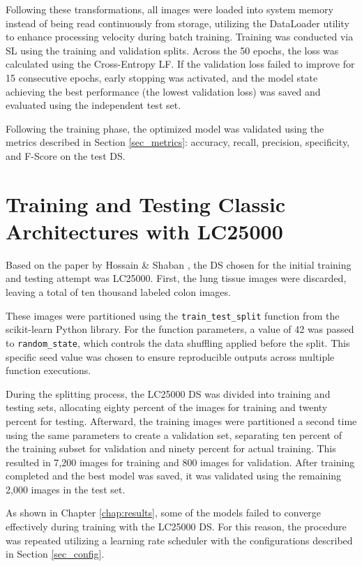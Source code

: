 Following these transformations, all images were loaded into system memory instead of being read continuously from storage, utilizing the DataLoader utility to enhance processing velocity during batch training. Training was conducted via \gls{SL} using the training and validation splits. Across the 50 epochs, the loss was calculated using the Cross-Entropy \gls{LF}. If the validation loss failed to improve for 15 consecutive epochs, early stopping was activated, and the model state achieving the best performance (the lowest validation loss) was saved and evaluated using the independent test set.

Following the training phase, the optimized model was validated using the metrics described in Section \ref{sec_metrics}: accuracy, recall, precision, specificity, and F-Score on the test \gls{DS}.


\section{Training and Testing Classic Architectures with LC25000}
\label{sec_first_attempt}
Based on the paper by Hossain \& Shaban \cite{DBLP:conf/aibthings/HossainS24}, the \gls{DS} chosen for the initial training and testing attempt was \gls{LC25000}. First, the lung tissue images were discarded, leaving a total of ten thousand labeled colon images.

These images were partitioned using the \texttt{train\_test\_split} function from the scikit-learn Python library. For the function parameters, a value of 42 was passed to \texttt{random\_state}, which controls the data shuffling applied before the split. This specific seed value was chosen to ensure reproducible outputs across multiple function executions. 

During the splitting process, the \gls{LC25000} \gls{DS} was divided into training and testing sets, allocating eighty percent of the images for training and twenty percent for testing. Afterward, the training images were partitioned a second time using the same parameters to create a validation set, separating ten percent of the training subset for validation and ninety percent for actual training. This resulted in 7,200 images for training and 800 images for validation. After training completed and the best model was saved, it was validated using the remaining 2,000 images in the test set.

As shown in Chapter \ref{chap:results}, some of the models failed to converge effectively during training with the \gls{LC25000} \gls{DS}. For this reason, the procedure was repeated utilizing a learning rate scheduler with the configurations described in Section \ref{sec_config}.

